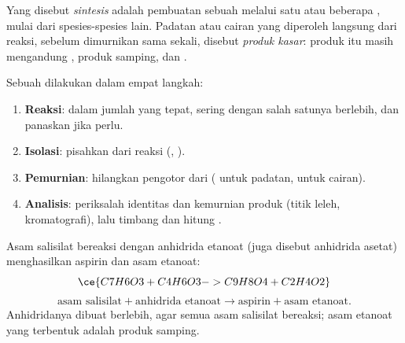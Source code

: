 \begin{definition}\label{def:g10:synthesis-yield:synthesis}
Yang disebut \emph{sintesis} adalah pembuatan sebuah
 melalui satu atau beberapa , mulai dari
spesies-spesies lain. Padatan atau cairan yang diperoleh langsung dari
 reaksi, sebelum dimurnikan sama sekali, disebut
\emph{produk kasar}: produk itu masih mengandung
, produk samping, dan .
\end{definition}

\begin{method}\label{met:g10:synthesis-yield:plan}
Sebuah  dilakukan dalam empat langkah:
\begin{enumerate}
  \item \textbf{Reaksi}:   dalam jumlah yang tepat,
        sering dengan salah satunya berlebih, dan panaskan jika perlu.
  \item \textbf{Isolasi}: pisahkan  dari  reaksi
        (, ).
  \item \textbf{Pemurnian}: hilangkan pengotor dari 
        ( untuk padatan,  untuk cairan).
  \item \textbf{Analisis}: periksalah identitas dan kemurnian produk
        (titik leleh, kromatografi), lalu timbang dan hitung
        .
\end{enumerate}
\end{method}

\begin{example}\label{ex:g10:synthesis-yield:aspirin}
Asam salisilat bereaksi dengan anhidrida etanoat (juga disebut
anhidrida asetat) menghasilkan aspirin dan asam etanoat:
\[
  \ce{C7H6O3 + C4H6O3 -> C9H8O4 + C2H4O2}
\]
\[
  \text{asam salisilat} + \text{anhidrida etanoat} \longrightarrow
  \text{aspirin} + \text{asam etanoat}.
\]
Anhidridanya dibuat berlebih, agar semua asam salisilat bereaksi; asam
etanoat yang terbentuk adalah produk samping.
\end{example}

